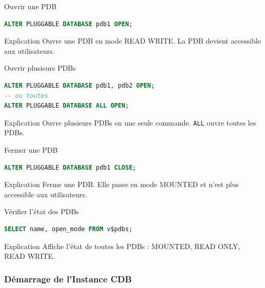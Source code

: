\documentclass[12pt,a4paper]{article}
\begin{document}
\begin{commande}{Ouvrir une PDB}
\begin{lstlisting}[language=SQL]
ALTER PLUGGABLE DATABASE pdb1 OPEN;
\end{lstlisting}
\end{commande}

\begin{explication}{Explication}
Ouvre une PDB en mode READ WRITE. La PDB devient accessible aux utilisateurs.
\end{explication}

\begin{commande}{Ouvrir plusieurs PDBs}
\begin{lstlisting}[language=SQL]
ALTER PLUGGABLE DATABASE pdb1, pdb2 OPEN;
-- ou toutes
ALTER PLUGGABLE DATABASE ALL OPEN;
\end{lstlisting}
\end{commande}

\begin{explication}{Explication}
Ouvre plusieurs PDBs en une seule commande. \texttt{ALL} ouvre toutes les PDBs.
\end{explication}

\begin{commande}{Fermer une PDB}
\begin{lstlisting}[language=SQL]
ALTER PLUGGABLE DATABASE pdb1 CLOSE;
\end{lstlisting}
\end{commande}

\begin{explication}{Explication}
Ferme une PDB. Elle passe en mode MOUNTED et n'est plus accessible aux utilisateurs.
\end{explication}

\begin{commande}{Vérifier l'état des PDBs}
\begin{lstlisting}[language=SQL]
SELECT name, open_mode FROM v$pdbs;
\end{lstlisting}
\end{commande}

\begin{explication}{Explication}
Affiche l'état de toutes les PDBs : MOUNTED, READ ONLY, READ WRITE.
\end{explication}

\subsubsection{Démarrage de l'Instance CDB}
\end{document}
